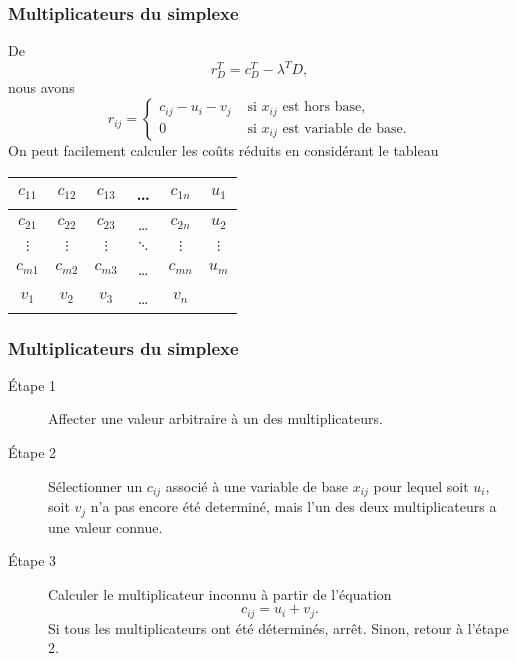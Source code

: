 \documentclass[usepdftitle=false, aspectratio=169]{beamer}
\begin{document}
\begin{frame}
\frametitle{Multiplicateurs du simplexe}

De
\[
r_D^T = c_D^T - \lambda^T D,
\]
nous avons
\[
r_{ij} =
\begin{cases}
c_{ij} - u_i - v_j &  \text{ si $x_{ij}$ est hors base,} \\
0 & \text{ si $x_{ij}$ est variable de base.}
\end{cases}
\]
On peut facilement calculer les coûts réduits en considérant le tableau
\begin{center}
\begin{tabular}{|c|c|c|c|c|c|}
\hline
$c_{11}$ & $c_{12}$ & $c_{13}$ & \ldots & $c_{1n}$ & $u_1$ \\
\hline
$c_{21}$ & $c_{22}$ & $c_{23}$ & \ldots & $c_{2n}$ & $u_2$ \\
\hline
$\vdots$ & $\vdots$ & $\vdots$ & $\ddots$ & $\vdots$ & $\vdots$ \\
\hline
$c_{m1}$ & $c_{m2}$ & $c_{m3}$ & \ldots & $c_{mn}$ & $u_m$ \\
\hline
$v_1$ & $v_2$ & $v_3$ & \ldots & $v_n$ & \\
\hline
\end{tabular}
\end{center}

\end{frame}

\begin{frame}
\frametitle{Multiplicateurs du simplexe}

\begin{description}
\item[Étape 1]
Affecter une valeur arbitraire à un des multiplicateurs.
\item[Étape 2]
Sélectionner un $c_{ij}$ associé à une variable de base $x_{ij}$ pour lequel soit $u_i$, soit $v_j$ n'a pas encore été determiné, mais l'un des deux multiplicateurs a une valeur connue.
\item[Étape 3]
Calculer le multiplicateur inconnu à partir de l'équation
\[
c_{ij} = u_i + v_j.
\]
Si tous les multiplicateurs ont été déterminés, arrêt. Sinon, retour à l'étape 2.
\end{description}

\end{frame}
\end{document}
